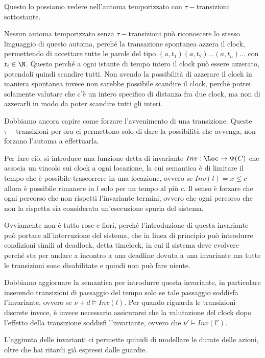 Questo lo possiamo vedere nell'automa temporizzato con \(\tau-\)transizioni sottostante.

Nessun automa temporizzato senza \(\tau-\)transizioni può riconoscere lo stesso linguaggio di questo automa, perché la transazione spontanea azzera il clock, permettendo di accettare tutte le parole del tipo \((a,t_1)(a,t_2)\ldots(a,t_n)\ldots\) con \(t_i \in \N\). Questo perché a ogni istante di tempo intero il clock può essere azzerato, potendoli quindi scandire tutti. Non avendo la possibilità di azzerare il clock in maniera spontanea invece non sarebbe possibile scandire il clock, perché potrei solamente valutare che c'è un intero specifico di distanza fra due clock, ma non di azzerarli in modo da poter scandire tutti gli interi.

Dobbiamo ancora capire come forzare l'avvenimento di una transizione. Queste \(\tau-\)transizioni per ora ci permettono solo di dare la possibilità che avvenga, non forzano l'automa a effettuarla.

Per fare ciò, si introduce una funzione detta di invariante \(Inv: \Loc \to \Phi(C)\) che associa un vincolo sui clock a ogni locazione, la cui semantica è di limitare il tempo che è possibile trascorrere in una locazione, ovvero se \(Inv(l) = x \leq c\) allora è possibile rimanere in \(l\) solo per un tempo al più \(c\). Il senso è forzare che ogni percorso che non rispetti l'invariante termini, ovvero che ogni percorso che non la rispetta sia considerata un'esecuzione spuria del sistema.

Ovviamente non è tutto rose e fiori, perché l'introduzione di questa invariante può portare all'interruzione del sistema, che in linea di principio può introdurre condizioni simili al deadlock, detta timelock, in cui il sistema deve evolvere perché sta per andare a incontro a una deadline dovuta a una invariante ma tutte le transizioni sono disabilitate e quindi non può fare niente.

Dobbiamo aggiornare la semantica per introdurre questa invariante, in particolare inserendo transizioni di passaggio del tempo solo se tale passaggio soddisfa l'invariante, ovvero se \(\nu + d \models Inv(l)\). Per quando riguarda le transizioni discrete invece, è invece necessario assicurarsi che la valutazione del clock dopo l'effetto della transizione soddisfi l'invariante, ovvero che \(\nu' \models Inv(l')\).

L'aggiunta delle invarianti ci permette quinidi di modellare le durate delle azioni, oltre che hai ritardi già espressi dalle guardie.

